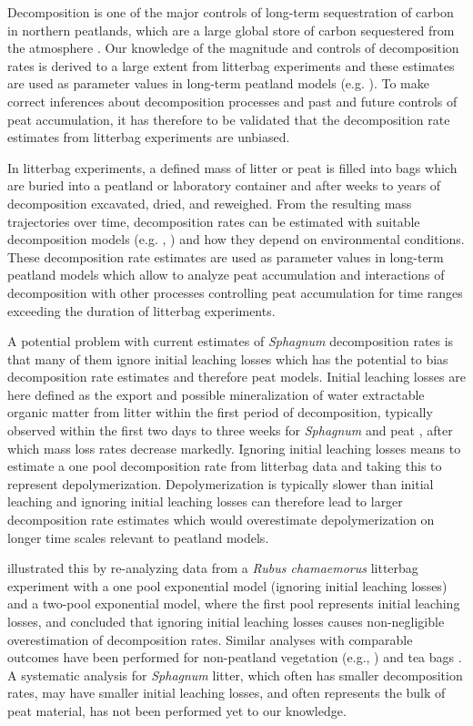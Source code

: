 \documentclass[bg, manuscript]{copernicus}
\begin{document}
\introduction[Introduction]

Decomposition is one of the major controls of long-term sequestration of carbon in northern peatlands, which are a large global store of carbon sequestered from the atmosphere \citep{Yu.2012}. Our knowledge of the magnitude and controls of decomposition rates is derived to a large extent from litterbag experiments \citep{Rydin.2013} and these estimates are used as parameter values in long-term peatland models (e.g. \citet{Frolking.2010}). To make correct inferences about decomposition processes and past and future controls of peat accumulation, it has therefore to be validated that the decomposition rate estimates from litterbag experiments are unbiased.

In litterbag experiments, a defined mass of litter or peat is filled into bags which are buried into a peatland or laboratory container and after weeks to years of decomposition excavated, dried, and reweighed. From the resulting mass trajectories over time, decomposition rates can be estimated with suitable decomposition models (e.g. \citet{Frolking.2001}, \citet{Rovira.2010}) and how they depend on environmental conditions. These decomposition rate estimates are used as parameter values in long-term peatland models which allow to analyze peat accumulation and interactions of decomposition with other processes controlling peat accumulation for time ranges exceeding the duration of litterbag experiments.

A potential problem with current estimates of \emph{Sphagnum} decomposition rates is that many of them ignore initial leaching losses which has the potential to bias decomposition rate estimates and therefore peat models. Initial leaching losses are here defined as the export and possible mineralization of water extractable organic matter from litter within the first period of decomposition, typically observed within the first two days to three weeks for \emph{Sphagnum} and peat \citep{Coulson.1978, Thormann.2001, Moore.2001, Kim.2014, Muller.2023}, after which mass loss rates decrease markedly. Ignoring initial leaching losses means to estimate a one pool decomposition rate from litterbag data and taking this to represent depolymerization. Depolymerization is typically slower than initial leaching and ignoring initial leaching losses can therefore lead to larger decomposition rate estimates which would overestimate depolymerization on longer time scales relevant to peatland models.

\citet{Yu.2001} illustrated this by re-analyzing data from a \emph{Rubus chamaemorus} litterbag experiment with a one pool exponential model (ignoring initial leaching losses) and a two-pool exponential model, where the first pool represents initial leaching losses, and concluded that ignoring initial leaching losses causes non-negligible overestimation of decomposition rates. Similar analyses with comparable outcomes have been performed for non-peatland vegetation (e.g., \citet{Barlocher.1997}) and tea bags \citep{Lind.2022}. A systematic analysis for \emph{Sphagnum} litter, which often has smaller decomposition rates, may have smaller initial leaching losses, and often represents the bulk of peat material, has not been performed yet to our knowledge.
\end{document}
